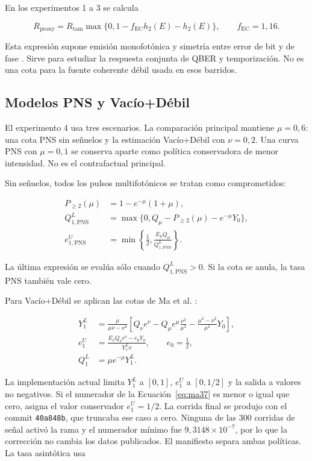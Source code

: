 \documentclass[12pt,a4paper]{article}
\newcommand{\hbin}[1]{h_2\!\left(#1\right)}
\begin{document}
En los experimentos 1 a 3 se calcula

\begin{equation}
  R_{\mathrm{proxy}}=R_{\mathrm{tam}}
  \max\{0,1-f_{\mathrm{EC}}\hbin{E}-\hbin{E}\},
  \qquad f_{\mathrm{EC}}=1{,}16.
  \label{eq:proxy}
\end{equation}

Esta expresión supone emisión monofotónica y simetría entre error de bit y de
fase \cite{shorPreskill2000}. Sirve para estudiar la respuesta conjunta de
QBER y temporización. No es una cota para la fuente coherente débil usada en
esos barridos.

\subsection*{Modelos PNS y Vacío+Débil}

El experimento 4 usa tres escenarios. La comparación principal mantiene
\(\mu=0{,}6\): una cota PNS sin señuelos y la estimación Vacío+Débil con
\(\nu=0{,}2\). Una curva PNS con \(\mu=0{,}1\) se conserva aparte como política
conservadora de menor intensidad. No es el contrafactual principal.

Sin señuelos, todos los pulsos multifotónicos se tratan como comprometidos:

\begin{align}
  P_{\geq2}(\mu)&=1-e^{-\mu}(1+\mu),\\
  Q_{1,\mathrm{PNS}}^L
  &=\max\{0,Q_\mu-P_{\geq2}(\mu)-e^{-\mu}Y_0\},\\
  e_{1,\mathrm{PNS}}^U
  &=\min\left\{\frac{1}{2},\frac{E_\mu Q_\mu}
  {Q_{1,\mathrm{PNS}}^L}\right\}.
\end{align}

La última expresión se evalúa sólo cuando
\(Q_{1,\mathrm{PNS}}^L>0\). Si la cota se anula, la tasa PNS también vale cero.

Para Vacío+Débil se aplican las cotas de Ma et al. \cite{maQiZhaoLo2005}:

\begin{align}
  Y_1^L&=\frac{\mu}{\mu\nu-\nu^2}
  \left[Q_\nu e^\nu-Q_\mu e^\mu\frac{\nu^2}{\mu^2}
  -\frac{\mu^2-\nu^2}{\mu^2}Y_0\right],\\
  e_1^U&=\frac{E_\nu Q_\nu e^\nu-e_0Y_0}{Y_1^L\nu},
  \qquad e_0=\frac{1}{2},\label{eq:ma37}\\
  Q_1^L&=\mu e^{-\mu}Y_1^L.
\end{align}

La implementación actual limita \(Y_1^L\) a \([0,1]\), \(e_1^U\) a
\([0,1/2]\) y la salida a valores no negativos. Si el numerador de la
Ecuación~\ref{eq:ma37} es menor o igual que cero, asigna el valor conservador
\(e_1^U=1/2\). La corrida final se produjo con el commit \texttt{40a848b}, que
truncaba ese caso a cero. Ninguna de las 300 corridas de señal activó la rama y
el numerador mínimo fue \(9{,}3148\times10^{-7}\), por lo que la corrección no
cambia los datos publicados. El manifiesto separa ambas políticas. La tasa
asintótica usa
\end{document}
